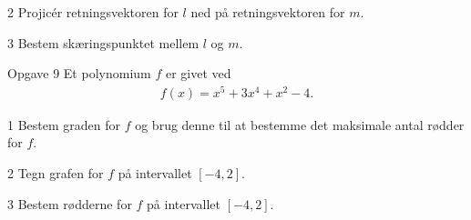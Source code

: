 \documentclass[12pt,x11names,a4paper]{article}
\begin{document}
\begin{delopgave}{}{2}
	Projicér retningsvektoren for $l$ ned på retningsvektoren for $m$.  
\end{delopgave}
\begin{delopgave}{}{3}
	Bestem skæringspunktet mellem $l$ og $m$.
\end{delopgave}
\begin{opgavetekst}{Opgave 9}
	Et polynomium $f$ er givet ved
	\begin{align*}
		f(x) = x^5+3x^4+x^2-4.
	\end{align*}
\end{opgavetekst}
\begin{delopgave}{}{1}
	Bestem graden for $f$ og brug denne til at bestemme det maksimale antal rødder for $f$. 
\end{delopgave}
\begin{delopgave}{}{2}
	Tegn grafen for $f$ på intervallet $[-4,2]$.
\end{delopgave}
\begin{delopgave}{}{3}
	Bestem rødderne for $f$ på intervallet $[-4,2]$.
\end{delopgave}
\end{document}
